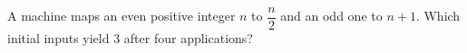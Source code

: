 A machine maps an even positive integer $n$ to $\dfrac{n}{2}$ and an odd one to $n+1$. Which initial inputs yield 3 after four applications?

